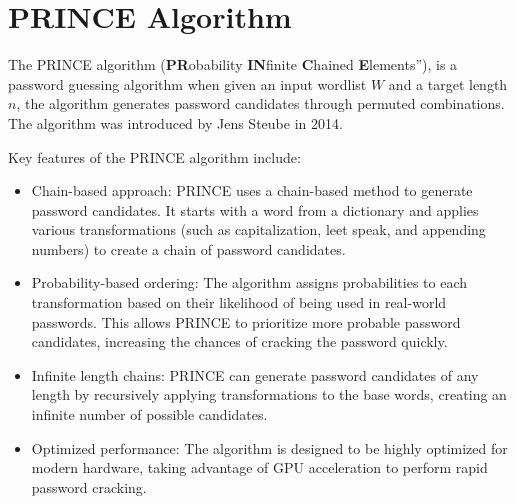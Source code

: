 \section{PRINCE Algorithm}
The PRINCE algorithm \cite{princeprocessor2015} (\textbf{PR}obability \textbf{IN}finite \textbf{C}hained \textbf{E}lements''), is a password guessing algorithm when given an input wordlist $W$ and a target length $n$, the algorithm generates password candidates through permuted combinations. The algorithm was introduced by Jens Steube in 2014.

Key features of the PRINCE algorithm include:

\begin{itemize}[leftmargin=11pt]
    \item Chain-based approach: PRINCE uses a chain-based method to generate password candidates. It starts with a word from a dictionary and applies various transformations (such as capitalization, leet speak, and appending numbers) to create a chain of password candidates.
    
    \item Probability-based ordering: The algorithm assigns probabilities to each transformation based on their likelihood of being used in real-world passwords. This allows PRINCE to prioritize more probable password candidates, increasing the chances of cracking the password quickly.
    
    \item Infinite length chains: PRINCE can generate password candidates of any length by recursively applying transformations to the base words, creating an infinite number of possible candidates.
    
    \item Optimized performance: The algorithm is designed to be highly optimized for modern hardware, taking advantage of GPU acceleration to perform rapid password cracking.
\end{itemize}
